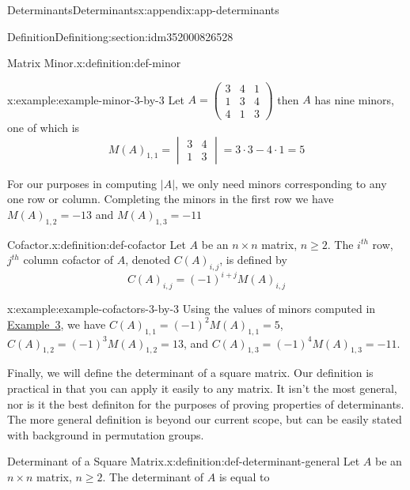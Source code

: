 \documentclass[oneside,10pt,]{book}
\begin{document}
\begin{appendixptx}{Determinants}{}{Determinants}{}{}{x:appendix:app-determinants}
\begin{sectionptx}{Definition}{}{Definition}{}{}{g:section:idm352000826528}
\begin{definition}{Matrix Minor.}{x:definition:def-minor}
\end{definition}
\begin{example}{}{x:example:example-minor-3-by-3}%
Let \(A = \begin{pmatrix}
3 & 4 & 1 \\
1 & 3 & 4 \\
4 & 1 & 3 
\end{pmatrix} \) then \(A\) has nine minors, one of which is%
\begin{equation*}
M(A)_{1,1} = \begin{vmatrix}
3 & 4 \\
1 & 3 
\end{vmatrix} = 3 \cdot 3 - 4 \cdot 1 =5
\end{equation*}
%
\par
For our purposes in computing \(\lvert A \rvert\), we only need minors corresponding to any one row or column.  Completing the minors in the first row we have \(M(A)_{1,2} = -13 \)   and  \(M(A)_{1,3} = -11 \)%
\end{example}
\begin{definition}{Cofactor.}{x:definition:def-cofactor}%
%
\label{g:notation:idm352000803344}%
Let \(A\) be an \(n \times n\) matrix, \(n \geq 2\). The \(i^{th}\) row, \(j^{th}\) column cofactor of  \(A\), denoted \(C(A)_{i,j}\), is defined by%
\begin{equation*}
C(A)_{i,j} = (-1)^{i+j} M(A)_{i,j}
\end{equation*}
%
\end{definition}
\begin{example}{}{x:example:example-cofactors-3-by-3}%
Using the values of minors computed in \hyperref[x:example:example-minor-3-by-3]{Example~3}, we have \(C(A)_{1,1} = (-1)^2 M(A)_{1,1} = 5\), \(C(A)_{1,2} = (-1)^3 M(A)_{1,2} = 13\), and \(C(A)_{1,3} = (-1)^4 M(A)_{1,3} = -11\).%
\end{example}
Finally, we will define the determinant of a square matrix. Our definition is practical in that you can apply it easily to any matrix.  It isn't the most general, nor is it the best definiton for the purposes of proving properties of determinants.  The more general definition is beyond our current scope, but can be easily stated with background in permutation groups.%
\begin{definition}{Determinant of a Square Matrix.}{x:definition:def-determinant-general}%
%
\label{g:notation:idm352000793792}%
Let \(A\) be an \(n \times n\) matrix, \(n \geq 2\). The determinant of \(A\) is equal to%

\end{definition}
\end{sectionptx}
\end{appendixptx}
\end{document}
